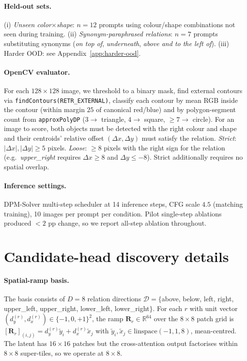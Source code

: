 \documentclass{article}
\theoremstyle{plain}
\theoremstyle{definition}
\begin{document}
\paragraph{Held-out sets.} (i) \emph{Unseen color$\times$shape}: $n{=}12$ prompts using colour/shape combinations not seen during training. (ii) \emph{Synonym-paraphrased relations}: $n{=}7$ prompts substituting synonyms (\textit{on top of}, \textit{underneath}, \textit{above and to the left of}). (iii) Harder OOD: see Appendix~\ref{app:harder-ood}.

\paragraph{OpenCV evaluator.} For each $128\!\times\!128$ image, we threshold to a binary mask, find external contours via \texttt{findContours(RETR\_EXTERNAL)}, classify each contour by mean RGB inside the contour (within margin $25$ of canonical red/blue) and by polygon-segment count from \texttt{approxPolyDP} ($3 \to$ triangle, $4 \to$ square, $\geq 7 \to$ circle). For an image to score, both objects must be detected with the right colour and shape and their centroids' relative offset $(\Delta x, \Delta y)$ must satisfy the relation. \emph{Strict}: $|\Delta x|, |\Delta y| \geq 5$ pixels. \emph{Loose}: $\geq 8$ pixels with the right sign for the relation (e.g.\ \textit{upper\_right} requires $\Delta x \geq 8$ and $\Delta y \leq -8$). Strict additionally requires no spatial overlap.

\paragraph{Inference settings.} DPM-Solver multi-step scheduler at 14 inference steps, CFG scale $4.5$ (matching training), 10 images per prompt per condition. Pilot single-step ablations produced $<\!2$ pp change, so we report all-step ablation throughout.

\section{Candidate-head discovery details}
\label{app:discovery}

\paragraph{Spatial-ramp basis.} The basis consists of $D{=}8$ relation directions $\mathcal{D} = \{$above, below, left, right, upper\_left, upper\_right, lower\_left, lower\_right$\}$. For each $r$ with unit vector $(d_y^{(r)}, d_x^{(r)}) \in \{-1, 0, +1\}^2$, the ramp $\mathbf{R}_r \in \mathbb{R}^{64}$ over the $8\!\times\!8$ patch grid is $[\mathbf{R}_r]_{(i,j)} = d_y^{(r)} \tilde y_i + d_x^{(r)} \tilde x_j$ with $\tilde y_i, \tilde x_j \in \mathrm{linspace}(-1, 1, 8)$, mean-centred. The latent has $16\!\times\!16$ patches but the cross-attention output factorises within $8\!\times\!8$ super-tiles, so we operate at $8\!\times\!8$.
\end{document}
